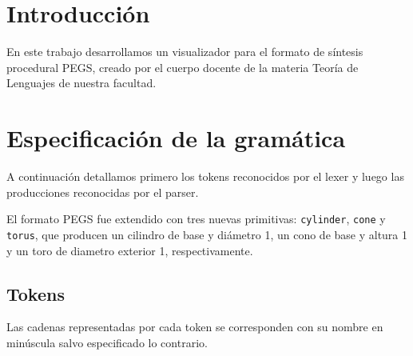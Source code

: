 \documentclass[a4paper, 10pt, twoside]{article}
\begin{document}
\newpage




\section{Introducción}

En este trabajo desarrollamos un visualizador para el formato de síntesis procedural PEGS, creado por el cuerpo docente de la materia Teoría de Lenguajes de nuestra facultad.


\section{Especificación de la gramática}

A continuación detallamos primero los tokens reconocidos por el lexer y luego las producciones reconocidas por el parser.

El formato PEGS fue extendido con tres nuevas primitivas: \texttt{cylinder}, \texttt{cone} y \texttt{torus}, que producen un cilindro de base y diámetro 1, un cono de base y altura 1 y un toro de diametro exterior 1, respectivamente.


\subsection{Tokens}

Las cadenas representadas por cada token se corresponden con su nombre en minúscula salvo especificado lo contrario.
\end{document}
